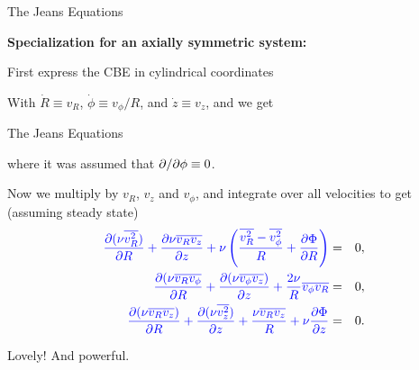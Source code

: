 \documentclass[letterpaper,landscape]{slides}
\begin{document}
\begin{slide}
\begin{center}
{\large \color{red} 
                    The Jeans Equations   }
\end{center}

{\bf Specialization for an axially symmetric system:}

First express the CBE in cylindrical coordinates 

With $\dot R \equiv v_R$, $\dot \phi \equiv v_\phi/R$, and $\dot z \equiv v_z$, and
we get

\vfill
\end{slide}


\begin{slide}
\begin{center}
{\large \color{red} 
                    The Jeans Equations   }
\end{center}
where it was assumed that ${\partial / \partial \phi} \equiv 0$. 

Now we multiply by $v_R$, $v_z$ and $v_\phi$, and integrate over all velocities
to get (assuming steady state)
\begin{eqnarray}
\color{blue}
{\partial(\nu \overline{v_R^2}) \over \partial R} + {\partial \nu \overline{v_R v_z}
\over \partial z} + \nu\left( {\overline{v_R^2} - \overline{v_\phi^2} \over
R} + {\partial \Phi \over \partial R} \right) & = & 0, \nonumber \\
\color{blue} {\partial(\nu \overline{v_R v_\phi} \over \partial R} + {\partial (\nu \overline{v_\phi
v_z}) \over \partial z } + {2\nu \over R}\overline{v_\phi v_R} & = & 0,
\label{cyljeans} \\
\color{blue} {\partial(\nu \overline{v_R v_z}) \over \partial R } + { \partial (\nu \overline{v_z^2})
\over \partial z } + { \nu \overline{v_R v_z} \over R} + \nu { \partial\Phi \over
\partial z} & = & 0. \nonumber
\end{eqnarray}

Lovely! And powerful.

\vfill
\end{slide}
\end{document}
